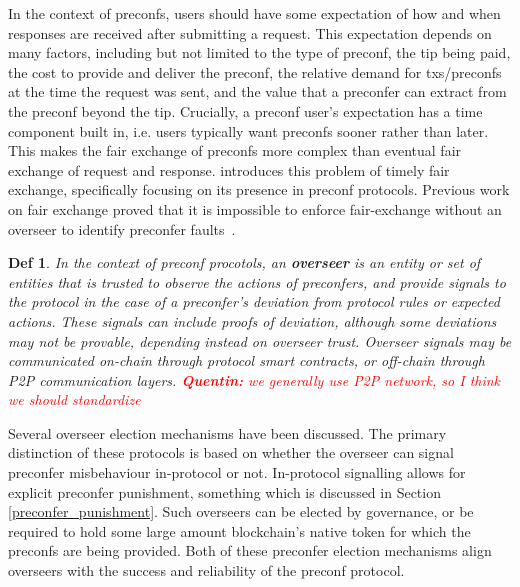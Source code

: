 \documentclass[a4paper]{article}
\theoremstyle{boldstyle}
\newtheorem*{definitionx}{Def}
\newenvironment{definition}
  {\begin{defopenboxq}\begin{definitionx}}
  {\end{definitionx}\end{defopenboxq}}
\newcommand{\qb}[1]{\textcolor{red}{\textbf{Quentin:} #1}}
\begin{document}
    In the context of preconfs, users should have some expectation of how and when responses are received after submitting a request. This expectation depends on many factors, including but not limited to the type of preconf, the tip being paid, the cost to provide and deliver the preconf, the relative demand for txs/preconfs at the time the request was sent, and the value that a preconfer can extract from the preconf beyond the tip. Crucially, a preconf user's expectation has a time component built in, i.e. users typically want preconfs sooner rather than later. This makes the fair exchange of preconfs more complex than eventual fair exchange of request and response. \cite{W:PreconfirmationFairExchange} introduces this problem of timely fair exchange, specifically focusing on its presence in preconf protocols. Previous work on fair exchange proved that it is impossible to enforce fair-exchange without an overseer to identify preconfer faults~\cite{P:OntheImpossibilityofFairExchangewithoutaTrustedThirdParty}.
    
    \begin{definition}
    In the context of preconf procotols, an \textbf{overseer} is an entity or set of entities that is trusted to observe the actions of preconfers, and provide signals to the protocol in the case of a preconfer's deviation from protocol rules or expected actions. These signals can include proofs of deviation, although some deviations may not be provable, depending instead on overseer trust. Overseer signals may be communicated on-chain through protocol smart contracts, or off-chain through P2P communication layers. \qb{we generally use P2P network, so I think we should standardize} 
    \end{definition}

    Several overseer election mechanisms have been discussed. The primary distinction of these protocols is based on whether the overseer can signal preconfer misbehaviour in-protocol or not. In-protocol signalling allows for explicit preconfer punishment, something which is discussed in Section \ref{preconfer_punishment}. Such overseers can be elected by governance, or be required to hold some large amount blockchain's native token for which the preconfs are being provided. Both of these preconfer election mechanisms align overseers with the success and reliability of the preconf protocol. 
    
\end{document}
